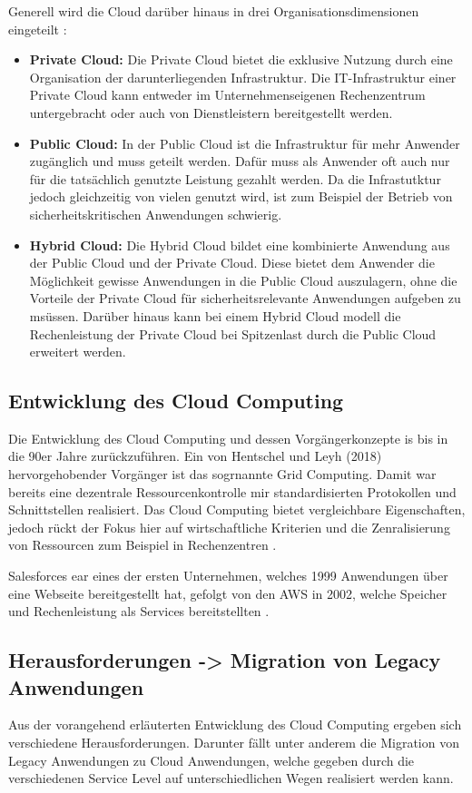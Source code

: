 Generell wird die Cloud darüber hinaus in drei Organisationsdimensionen eingeteilt \cite[Vgl. auch im Folgenden][S. 7ff]{Reinheimer2018}:
\begin{itemize}
\item \textbf{Private Cloud:} Die Private Cloud bietet die exklusive Nutzung durch eine Organisation der darunterliegenden Infrastruktur. 
Die IT-Infrastruktur einer Private Cloud kann entweder im Unternehmenseigenen Rechenzentrum untergebracht oder auch
von Dienstleistern bereitgestellt werden.
\item \textbf{Public Cloud:} In der Public Cloud ist die Infrastruktur für mehr Anwender zugänglich und muss geteilt werden. Dafür muss als Anwender oft
auch nur für die tatsächlich genutzte Leistung gezahlt werden. Da die Infrastutktur jedoch gleichzeitig von vielen genutzt wird, ist zum Beispiel der
Betrieb von sicherheitskritischen Anwendungen schwierig.
\item \textbf{Hybrid Cloud:} Die Hybrid Cloud bildet eine kombinierte Anwendung aus der Public Cloud und der Private Cloud. Diese bietet dem Anwender die
Möglichkeit gewisse Anwendungen in die Public Cloud auszulagern, ohne die Vorteile der Private Cloud für sicherheitsrelevante Anwendungen aufgeben zu msüssen.
Darüber hinaus kann bei einem Hybrid Cloud modell die Rechenleistung der Private Cloud bei Spitzenlast durch die Public Cloud erweitert werden. 
\end{itemize}

\pagebreak

\subsection{Entwicklung des Cloud Computing}

Die Entwicklung des Cloud Computing und dessen Vorgängerkonzepte is bis in die 90er Jahre zurückzuführen.
Ein von Hentschel und Leyh (2018) hervorgehobender Vorgänger ist das sogrnannte Grid Computing.
Damit war bereits eine dezentrale Ressourcenkontrolle mir standardisierten Protokollen und
Schnittstellen realisiert. Das Cloud Computing bietet vergleichbare Eigenschaften, jedoch rückt der
Fokus hier auf wirtschaftliche Kriterien und die Zenralisierung von Ressourcen zum Beispiel in
Rechenzentren \cite[Vgl.][S. 5f]{Reinheimer2018}.

Salesforces ear eines der ersten Unternehmen, welches 1999 Anwendungen über eine Webseite bereitgestellt hat,
gefolgt von den \ac{AWS} in 2002, welche Speicher und Rechenleistung als Services bereitstellten \cite[Vgl.][S. 17f]{Srivastava2018}.

\pagebreak

\subsection{Herausforderungen -> Migration von Legacy Anwendungen}

Aus der vorangehend erläuterten Entwicklung des Cloud Computing ergeben sich verschiedene Herausforderungen.
Darunter fällt unter anderem die Migration von Legacy Anwendungen zu Cloud Anwendungen, welche gegeben durch die verschiedenen Service Level
auf unterschiedlichen Wegen realisiert werden kann.